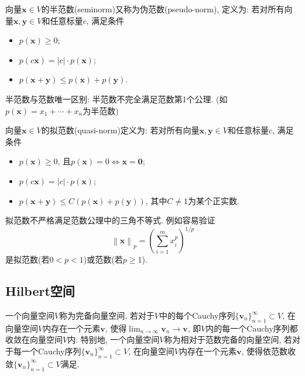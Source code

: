 \documentclass[lang=cn,10pt]{gorgeousnbook}
\numberwithin{equation}{section}%
\numberwithin{figure}{section}%
\begin{document}
\begin{definition}
向量$\bm{x}\in V$的半范数(seminorm)又称为伪范数(pseudo-norm), 定义为: 若对所有向量$\bm{x},\bm{y}\in V$和任意标量$c$, 满足条件
\begin{itemize}
\item $p(\boldsymbol{x})\geqslant0$;
\item $p(c\boldsymbol{x})=|c|\cdot p(\boldsymbol{x})$;
\item $p(\boldsymbol{x}+\boldsymbol{y})\leqslant p(\boldsymbol{x})+p(\boldsymbol{y})$.
\end{itemize}
\end{definition}

\begin{note}
半范数与范数唯一区别: 半范数不完全满足范数第1个公理. (如$p(\boldsymbol{x})=x_1+\cdots+x_n$为半范数)
\end{note}
\begin{definition}[拟范数]
向量$\bm{x}\in V$的拟范数(quasi-norm)定义为: 若对所有向量$\bm{x},\bm{y}\in V$和任意标量$c$, 满足条件
\begin{itemize}
\item $p(\boldsymbol{x})\geqslant0$, 且$p(\boldsymbol{x})=0\Leftrightarrow\boldsymbol{x}=\boldsymbol{0}$;
\item $p(c\boldsymbol{x})=|c|\cdot p(\boldsymbol{x})$;
\item $p(\boldsymbol{x}+\boldsymbol{y})\leqslant C(p(\boldsymbol{x})+p(\boldsymbol{y}))$, 其中$C\neq1$为某个正实数. 
\end{itemize}
\end{definition}
\begin{note}
拟范数不严格满足范数公理中的三角不等式. 例如容易验证
\begin{equation}
\left\|\boldsymbol{x}\right\|_p=\left(\sum_{i=1}^mx_i^p\right)^{1/p}
\end{equation}
是拟范数(若$0<p<1$)或范数(若$p\ge 1$).
\end{note}
\subsection{Hilbert空间}
\begin{definition}[完备性]
一个向量空间$V$称为完备向量空间, 若对于$V$中的每个Cauchy序列$\{\boldsymbol{v}_n\}_{n=1}^\infty\subset V$, 在向量空间$V$内存在一个元素$\boldsymbol{v}$, 使得$\lim_{n\to\infty}\boldsymbol{v}_n\to\boldsymbol{v}$, 即$V$内的每一个Cauchy序列都收敛在向量空间$V$内. 特别地, 一个向量空间$V$称为相对于范数完备的向量空间, 若对于每一个Cauchy序列$\{\boldsymbol{v}_n\}_{n=1}^\infty\subset V$, 在向量空间$V$内存在一个元素$\boldsymbol{v}$, 使得依范数收敛$\{\boldsymbol{v}_n\}_{n=1}^\infty\subset V$满足. 
\end{definition}
\end{document}
